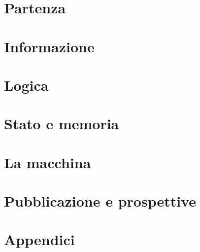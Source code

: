 \documentclass[11pt,twoside,openright]{book}
\begin{document}
\frontmatter


\tableofcontents




\mainmatter
\setcounter{chapter}{-1}

\part{Partenza}




\part{Informazione}






\part{Logica}






\part{Stato e memoria}






\part{La macchina}






\part{Pubblicazione e prospettive}



\appendix
\part{Appendici}







\backmatter

\end{document}
